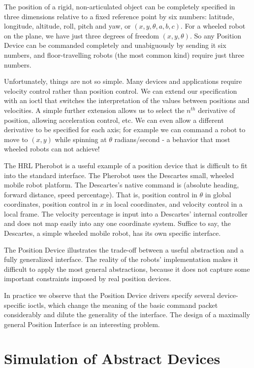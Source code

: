 \documentclass[letterpaper, 10 pt, conference]{iros03}
\begin{document}
The position of a rigid, non-articulated object can be completely
specified in three dimensions relative to a fixed reference point by
six numbers: latitude, longitude, altitude, roll, pitch and yaw, or
$(x, y, \theta, a, b, c)$. For a wheeled robot on the plane, we have
just three degrees of freedom $(x, y, \theta)$.  So any Position
Device can be commanded completely and unabiguously by sending it six
numbers, and floor-travelling robots (the most common kind) require
just three numbers.

Unfortunately, things are not so simple. Many devices and applications
require velocity control rather than position control. We can extend
our specification with an ioctl that switches the interpretation of
the values between positions and velocities. A simple further
extension allows us to select the $n^{th}$ derivative of position,
allowing acceleration control, etc. We can even allow a different
derivative to be specified for each axis; for example we can command a
robot to move to $(x,y)$ while spinning at $\theta$ radians/second - a
behavior that most wheeled robots can not achieve! 

The HRL Pherobot is a useful example of a position device that is
difficult to fit into the standard interface. The Pherobot uses the
Descartes small, wheeled mobile robot platform. The Descartes's native
command is (absolute heading, forward distance, speed
percentage). That is, position control in $\theta$ in global
coordinates, position control in $x$ in local coordinates, and
velocity control in a local frame. The velocity percentage is input
into a Descartes' internal controller and does not map easily into any
one coordinate system. Suffice to say, the Descartes, a simple wheeled
mobile robot, has its own specific interface.

The Position Device illustrates the trade-off between a useful
abstraction and a fully generalized interface. The reality of the
robots' implementation makes it difficult to apply the most general
abstractions, because it does not capture some important constraints
imposed by real position devices.

In practice we observe that the Position Device drivers specify
several device-specific ioctls, which change the meaning of the basic
command packet considerably and dilute the generality of the
interface. The design of a maximally general Position Interface is an
interesting problem.

\section{Simulation of Abstract Devices}
\end{document}
